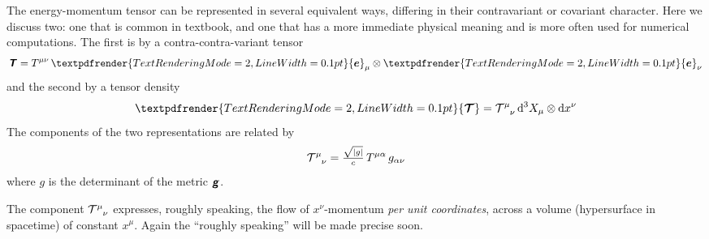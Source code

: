 \documentclass[\ifafour a4paper,12pt,\else a5paper,10pt,\fi%
onecolumn,oneside,article,%
british%
]{memoir}
\newcommand*{\mathte}[1]{\textbf{\textit{\textsf{#1}}}}
\renewcommand*{\bm}[1]{\textpdfrender{TextRenderingMode=2,LineWidth=0.1pt}{\boldsymbol{#1}}}
\newcommand*{\di}{\mathrm{d}}%
\DeclarePairedDelimiter\abs{\lvert}{\rvert}
\renewcommand*{\|}[1][]{\nonscript\:#1\vert\nonscript\:\mathopen{}}
\renewcommand*{\i}{{}\indices}
\newcommand*{\ve}[1]{\bm{e}_{#1}}
\newcommand*{\vi}[1]{\di{#1}}
\newcommand*{\ttti}[1]{\di^{3}X_{#1}}
\newcommand*{\yg}{\mathte{g}}
\newcommand*{\dg}{\sqrt{\abs{g}}}
\newcommand*{\yTTe}{\mathte{T}}
\newcommand*{\yTT}{\bm{\mathcal{T}}}
\newcommand*{\yT}{\mathcal{T}}
\begin{document}
\medskip

The energy-momentum tensor can be represented in several equivalent ways, differing in their contravariant or covariant character. Here we discuss two: one that is common in textbook, and one that has a more immediate physical meaning and is more often used for numerical computations. The first is by a contra-contra-variant tensor
\begin{equation}
  \label{eq:energy-momentum-contraco}
  \yTTe = T\i{^{\mu\nu}}\,\ve{\mu}\otimes\ve{\nu}
\end{equation}
and the second by a tensor density
\begin{equation}
  \label{eq:energy-momentum-tdens}
  \yTT = \yT\i{^{\mu}_{\nu}}\,\ttti{\mu}\otimes\vi{x^{\nu}}
\end{equation}
The components of the two representations are related by
\begin{equation}
  \label{eq:relation_components_EMt}
  \yT\i{^{\mu}_{\nu}} = \tfrac{\dg}{c} \, T\i{^{\mu\alpha}} \, g_{\alpha\nu}
\end{equation}
where $g$ is the determinant of the metric $\yg$.

The component $\yT\i{^{\mu}_{\nu}}$ expresses, roughly speaking, the flow of $x^{\nu}$-momentum \emph{per unit coordinates}, across a volume (hypersurface in spacetime) of constant $x^{\mu}$. Again the \enquote{roughly speaking} will be made precise soon.
\end{document}
